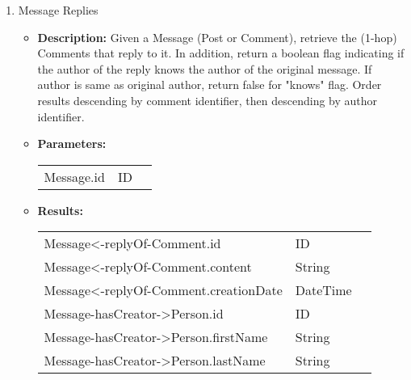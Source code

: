 \begin{enumerate}
  \item Message Replies
    \begin{itemize}
      \item \textbf{Description:}
        Given a Message (Post or Comment), retrieve the (1-hop) Comments that reply to it.
        In addition, return a boolean flag indicating if the author of the reply knows the author of the original message.
        If author is same as original author, return false for "knows" flag.
        Order results descending by comment identifier, then descending by author identifier.
      \item \textbf{Parameters:} \\
        \begin{tabular}{lll}
          Message.id 										& ID \\
        \end{tabular}
      \item \textbf{Results:} \\
        \begin{tabular}{lll}
          Message<-replyOf-Comment.id                       & ID \\
          Message<-replyOf-Comment.content                       & String \\
          Message<-replyOf-Comment.creationDate                       & DateTime \\
          Message-hasCreator->Person.id     									& ID \\
          Message-hasCreator->Person.firstName    									& String \\
          Message-hasCreator->Person.lastName     									& String \\
        \end{tabular}
    \end{itemize}

\end{enumerate}


